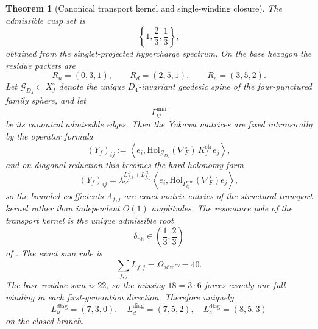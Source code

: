 \documentclass[11pt,a4paper]{article}
\newtheorem{theorem}{Theorem}[section]
\theoremstyle{definition}
\theoremstyle{remark}
\newcommand{\Oadm}{\Omega_{\mathrm{adm}}}
\newcommand{\lambdaY}{\lambda_Y}
\begin{document}
\begin{theorem}[Canonical transport kernel and single-winding closure]
\label{thm:exact-transport-closure}
\label{thm:canonical-transport-kernel}
The admissible cusp set is
\[
\left\{1,\frac23,\frac13\right\},
\]
obtained from the singlet-projected hypercharge spectrum. On the base hexagon the residue packets
are
\[
R_u=(0,3,1),
\qquad
R_d=(2,5,1),
\qquad
R_e=(3,5,2).
\]
Let $\mathcal G_{D_4}\subset X_f^\circ$ denote the unique $D_4$-invariant geodesic spine of the
four-punctured family sphere, and let
\[
\Gamma_{ij}^{\min}
\]
be its canonical admissible edges. Then the Yukawa matrices are fixed intrinsically by the operator
formula
\[
(Y_f)_{ij}
:=
\left\langle e_i,\mathrm{Hol}_{\mathcal G_{D_4}}(\nabla_F^\star)\,K_f^{\mathrm{str}}e_j\right\rangle,
\]
and on diagonal reduction this becomes the hard holonomy form
\[
(Y_f)_{ij}
=
\lambdaY^{L^L_{f,i}+L^R_{f,j}}
\left\langle e_i,\mathrm{Hol}_{\Gamma_{ij}^{\min}}(\nabla_F^\star)e_j\right\rangle,
\]
so the bounded coefficients $\Lambda_{f,j}$ are exact matrix entries of the structural transport
kernel rather than independent $O(1)$ amplitudes. The resonance pole of the transport kernel is the
unique admissible root
\[
\delta_{\mathrm{ph}}\in\left(\frac13,\frac23\right)
\]
of . The exact sum rule is
\[
\sum_{f,j}L_{f,j}=\Oadm\gamma=40.
\]
The base residue sum is $22$, so the missing $18=3\cdot 6$ forces exactly one full winding in
each first-generation direction. Therefore uniquely
\[
L_u^{\mathrm{diag}}=(7,3,0),\quad
L_d^{\mathrm{diag}}=(7,5,2),\quad
L_e^{\mathrm{diag}}=(8,5,3)
\]
on the closed branch.
\end{theorem}
\end{document}
